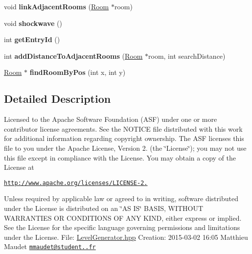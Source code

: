 \begin{DoxyCompactItemize}
\item 
\hypertarget{class_level_generator_aaaccd1f1c3b4331d30ba5a56b3d027f8}{void {\bfseries link\-Adjacent\-Rooms} (\hyperlink{class_room}{Room} $\ast$room)}\label{class_level_generator_aaaccd1f1c3b4331d30ba5a56b3d027f8}

\item 
\hypertarget{class_level_generator_afaa688bd1e11103c8afb45dbfa41c0c7}{void {\bfseries shockwave} ()}\label{class_level_generator_afaa688bd1e11103c8afb45dbfa41c0c7}

\item 
\hypertarget{class_level_generator_ab9f4dd15ee1d8f0659d3df0956d087af}{int {\bfseries get\-Entry\-Id} ()}\label{class_level_generator_ab9f4dd15ee1d8f0659d3df0956d087af}

\item 
\hypertarget{class_level_generator_af8a3c3f49855932e09da03107205c72f}{int {\bfseries add\-Distance\-To\-Adjacent\-Rooms} (\hyperlink{class_room}{Room} $\ast$room, int search\-Distance)}\label{class_level_generator_af8a3c3f49855932e09da03107205c72f}

\item 
\hypertarget{class_level_generator_a6af493402fdf30516ea0c122d2c82a4b}{\hyperlink{class_room}{Room} $\ast$ {\bfseries find\-Room\-By\-Pos} (int x, int y)}\label{class_level_generator_a6af493402fdf30516ea0c122d2c82a4b}

\end{DoxyCompactItemize}


\subsection{Detailed Description}
Licensed to the Apache Software Foundation (A\-S\-F) under one or more contributor license agreements. See the N\-O\-T\-I\-C\-E file distributed with this work for additional information regarding copyright ownership. The A\-S\-F licenses this file to you under the Apache License, Version 2. (the \char`\"{}\-License\char`\"{}); you may not use this file except in compliance with the License. You may obtain a copy of the License at

\href{http://www.apache.org/licenses/LICENSE-2.0}{\tt http\-://www.\-apache.\-org/licenses/\-L\-I\-C\-E\-N\-S\-E-\/2.}

Unless required by applicable law or agreed to in writing, software distributed under the License is distributed on an \char`\"{}\-A\-S I\-S\char`\"{} B\-A\-S\-I\-S, W\-I\-T\-H\-O\-U\-T W\-A\-R\-R\-A\-N\-T\-I\-E\-S O\-R C\-O\-N\-D\-I\-T\-I\-O\-N\-S O\-F A\-N\-Y K\-I\-N\-D, either express or implied. See the License for the specific language governing permissions and limitations under the License. File\-: \hyperlink{_level_generator_8hpp_source}{Level\-Generator.\-hpp} Creation\-: 2015-\/03-\/02 16\-:05 Matthieu Maudet \href{mailto:mmaudet@student.42.fr}{\tt mmaudet@student..\-fr} 

